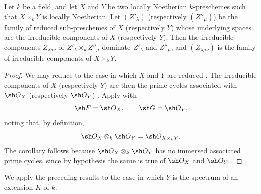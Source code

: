 \begin{corollary}[4.2.6]
\label{IV.4.2.6}
Let $k$ be a field, and let $X$ and $Y$ be two locally Noetherian
$k$-preschemes such that $X\times_k Y$ is locally Noetherian.
Let $(Z'_\lambda)$ (respectively $(Z''_\mu)$) be the family of reduced
sub-preschemes of $X$ (respectively $Y$) whose underlying spaces are
the irreducible components of $X$ (respectively $Y$).
Then the irreducible components $Z_{\lambda\mu\nu}$ of
$Z'_\lambda\times_k Z''_\mu$ dominate $Z'_\lambda$ and $Z''_\mu$, and
$(Z_{\lambda\mu\nu})$ is the family of irreducible components of
$X\times_k Y$.
\end{corollary}

\begin{proof}
We may reduce to the case in which $X$ and $Y$ are reduced
.
The irreducible components of $X$ (respectively $Y$) are then the prime
cycles associated with $\sh O_X$ (respectively $\sh O_Y$)
.
Apply  with
\[
\sh F=\sh O_X,
\qquad
\sh G=\sh O_Y,
\]
noting that, by definition,
\[
\sh O_X\otimes_k\sh O_Y=\sh O_{X\times_k Y}.
\]
The corollary follows because $\sh O_X\otimes_k\sh O_Y$ has no immersed
associated prime cycles, since by hypothesis the same is true of
$\sh O_X$ and $\sh O_Y$ .
\end{proof}

We apply the preceding results to the case in which $Y$ is the spectrum
of an extension $K$ of $k$.

